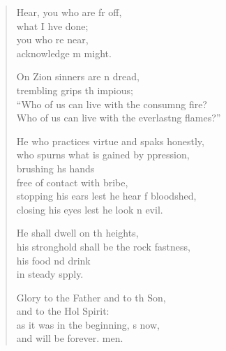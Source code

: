 \begin{verse}
  \begin{patverse}
Hear, you who are fr off,\Med\\
what I hve done;\\
you who re near,\Med\\
acknowledge m might.

On Zion sinners are \pointup{\i}n dread,\Med\\
trembling grips th impious;\\
“Who of us can live with the consum\pointup{\i}ng fire?\Med\\
Who of us can live with the everlast\pointup{\i}ng flames?”

He who practices virtue and spaks honestly,\Med\\
who spurns what is gained by ppression,\\
brushing h\pointup{\i}s hands\Med\\
free of contact with  bribe,\\
stopping his ears lest he hear f bloodshed,\Med\\
closing his eyes lest he look n evil.

He shall dwell on th heights,\Med\\
his stronghold shall be the rock fastness,\\
his food nd drink\Med\\
in steady spply.

Glory to the Father and to th Son,\Med\\
and to the Hol Spirit:\\
as it was in the beginning, \pointup{\i}s now,\Med\\
and will be forever. men. 
  \end{patverse}
\end{verse}
